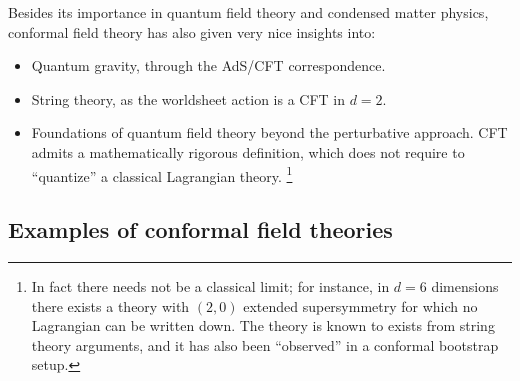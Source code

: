 \documentclass[a4paper,12pt]{article}
\numberwithin{equation}{section}
\begin{document}
Besides its importance in quantum field theory and condensed matter physics, conformal field theory has also given very nice insights into:
\begin{itemize}

\item
Quantum gravity, through the AdS/CFT correspondence.

\item
String theory, as the worldsheet action is a CFT in $d = 2$.

\item
Foundations of quantum field theory beyond the perturbative approach.
CFT admits a mathematically rigorous definition, which does not require to ``quantize'' a classical Lagrangian theory.%
%
\footnote{In fact there needs not be a classical limit; for instance, in $d = 6$ dimensions there exists a theory with $(2,0)$ extended supersymmetry for which no Lagrangian can be written down. The theory is known to exists from string theory arguments, and it has also been ``observed'' in a conformal bootstrap setup.}
%

\end{itemize}


\subsection{Examples of conformal field theories}
\end{document}
